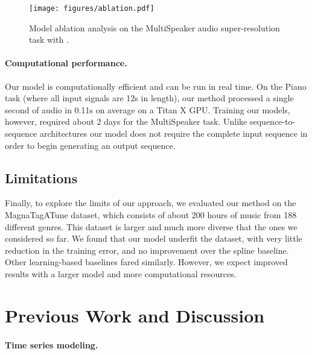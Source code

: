 \documentclass{article} \usepackage{iclr2017_workshop,times}
\begin{document}
\begin{wrapfigure}{r}{0.53\textwidth}
\label{fig:curves}
\vspace{-5mm}
\texttt{[image: figures/ablation.pdf]}
\vspace{-7mm}
\begin{small}
\caption{Model ablation analysis on the MultiSpeaker audio super-resolution task with .
}\end{small}
\end{wrapfigure}





\paragraph{Computational performance.}

Our model is computationally efficient and can be run in real time. 
On the {\sc Piano} task (where all input signals are 12s in length), our method processed a single second of audio in 0.11s on average on a Titan X GPU. Training our models, however, required about 2 days for the {\sc MultiSpeaker} task.
Unlike sequence-to-sequence architectures our model does not require the complete input sequence in order to begin generating an output sequence.

\subsection{Limitations}

Finally, to explore the limits of our approach, we evaluated our method on the MagnaTagATune dataset, which consists of about 200 hours of music from 188 different genres. This dataset is larger and much more diverse that the ones we considered so far. We found that our model underfit the dataset, with very little reduction in the training error, and no improvement over the spline baseline. Other learning-based baselines fared similarly. However, we expect improved results with a larger model and more computational resources.

\section{Previous Work and Discussion}

\paragraph{Time series modeling.}
\end{document}
